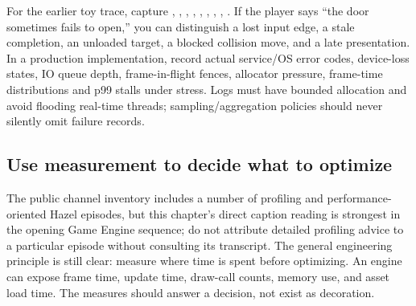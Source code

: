 For the earlier toy trace, capture , , , , , , , , . If the player says ``the door sometimes fails to open,'' you can distinguish a lost input edge, a stale completion, an unloaded target, a blocked collision move, and a late presentation. In a production implementation, record actual service/OS error codes, device-loss states, IO queue depth, frame-in-flight fences, allocator pressure, frame-time distributions and p99 stalls under stress. Logs must have bounded allocation and avoid flooding real-time threads; sampling/aggregation policies should never silently omit failure records.

\subsection{Use measurement to decide what to optimize}\label{06-engine-ii-ch041-use-measurement-to-decide-what-to-optimize}

\hypertarget{06-engine-ii-ch041-use-measurement-to-decide-what-to-optimize}{}

The public channel inventory includes a number of profiling and performance-oriented Hazel episodes, but this chapter's direct caption reading is strongest in the opening Game Engine sequence; do not attribute detailed profiling advice to a particular episode without consulting its transcript. The general engineering principle is still clear: measure where time is spent before optimizing. An engine can expose frame time, update time, draw-call counts, memory use, and asset load time. The measures should answer a decision, not exist as decoration.

